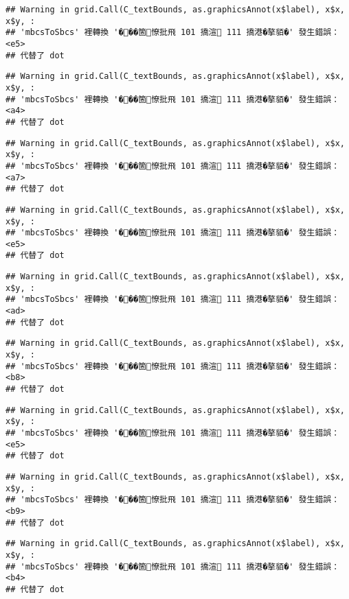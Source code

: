 \documentclass[
]{article}
\begin{document}
\begin{verbatim}
## Warning in grid.Call(C_textBounds, as.graphicsAnnot(x$label), x$x, x$y, :
## 'mbcsToSbcs' 裡轉換 '���箇憭批飛 101 撟渲 111 撟港�摮貊�' 發生錯誤：<e5>
## 代替了 dot
\end{verbatim}

\begin{verbatim}
## Warning in grid.Call(C_textBounds, as.graphicsAnnot(x$label), x$x, x$y, :
## 'mbcsToSbcs' 裡轉換 '���箇憭批飛 101 撟渲 111 撟港�摮貊�' 發生錯誤：<a4>
## 代替了 dot
\end{verbatim}

\begin{verbatim}
## Warning in grid.Call(C_textBounds, as.graphicsAnnot(x$label), x$x, x$y, :
## 'mbcsToSbcs' 裡轉換 '���箇憭批飛 101 撟渲 111 撟港�摮貊�' 發生錯誤：<a7>
## 代替了 dot
\end{verbatim}

\begin{verbatim}
## Warning in grid.Call(C_textBounds, as.graphicsAnnot(x$label), x$x, x$y, :
## 'mbcsToSbcs' 裡轉換 '���箇憭批飛 101 撟渲 111 撟港�摮貊�' 發生錯誤：<e5>
## 代替了 dot
\end{verbatim}

\begin{verbatim}
## Warning in grid.Call(C_textBounds, as.graphicsAnnot(x$label), x$x, x$y, :
## 'mbcsToSbcs' 裡轉換 '���箇憭批飛 101 撟渲 111 撟港�摮貊�' 發生錯誤：<ad>
## 代替了 dot
\end{verbatim}

\begin{verbatim}
## Warning in grid.Call(C_textBounds, as.graphicsAnnot(x$label), x$x, x$y, :
## 'mbcsToSbcs' 裡轉換 '���箇憭批飛 101 撟渲 111 撟港�摮貊�' 發生錯誤：<b8>
## 代替了 dot
\end{verbatim}

\begin{verbatim}
## Warning in grid.Call(C_textBounds, as.graphicsAnnot(x$label), x$x, x$y, :
## 'mbcsToSbcs' 裡轉換 '���箇憭批飛 101 撟渲 111 撟港�摮貊�' 發生錯誤：<e5>
## 代替了 dot
\end{verbatim}

\begin{verbatim}
## Warning in grid.Call(C_textBounds, as.graphicsAnnot(x$label), x$x, x$y, :
## 'mbcsToSbcs' 裡轉換 '���箇憭批飛 101 撟渲 111 撟港�摮貊�' 發生錯誤：<b9>
## 代替了 dot
\end{verbatim}

\begin{verbatim}
## Warning in grid.Call(C_textBounds, as.graphicsAnnot(x$label), x$x, x$y, :
## 'mbcsToSbcs' 裡轉換 '���箇憭批飛 101 撟渲 111 撟港�摮貊�' 發生錯誤：<b4>
## 代替了 dot
\end{verbatim}
\end{document}

